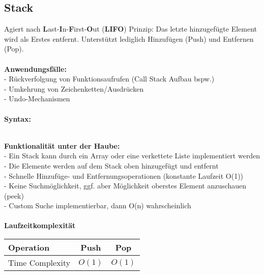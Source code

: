 \documentclass[../main.tex]{subfiles}
\begin{document}
	\subsection{Stack}
	Agiert nach \textbf{L}ast-\textbf{I}n-\textbf{F}irst-\textbf{O}ut (\textbf{LIFO}) Prinzip: Das letzte hinzugefügte Element wird als Erstes entfernt.
	Unterstützt lediglich Hinzufügen (Push) und Entfernen (Pop). \\\\
	\textbf{Anwendungsfälle:}\\
	- Rückverfolgung von Funktionsaufrufen (Call Stack Aufbau bspw.)\\
	- Umkehrung von Zeichenketten/Ausdrücken\\
	- Undo-Mechanismen\\\\
	\textbf{Syntax:}
	 
	\\
	\textbf{Funktionalität unter der Haube:}\\
	- Ein Stack kann durch ein Array oder eine verkettete Liste implementiert werden\\
	- Die Elemente werden auf dem Stack oben hinzugefügt und entfernt\\
	- Schnelle Hinzufüge- und Entfernungsoperationen (konstante Laufzeit O(1))\\
	- Keine Suchmöglichkeit, ggf. aber Möglichkeit oberstes Element anzuschauen (peek)\\
	- Custom Suche implementierbar, dann O(n) wahrscheinlich\\\\
	\textbf{Laufzeitkomplexität}\\
	\begin{table}[ht]
		\centering
		\begin{tabular}{l *{2}{c}}
			\toprule
			Operation & Push & Pop  \\
			\midrule
			Time Complexity & $O(1)$ & $O(1)$\\
			\bottomrule
		\end{tabular}
	\end{table}
	\clearpage
	
\end{document}
